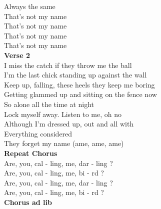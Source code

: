 Always the same \\
That's not my name \\
That's not my name \\
That's not my name \\
That's not my name \\
\textbf{Verse 2}\\
I miss the catch if they throw me the ball \\
I'm the last chick standing up against the wall \\
Keep up, falling, these heels they keep me boring \\
Getting glammed up and sitting on the fence now \\
So alone all the time at night \\
Lock myself away. Listen to me, oh no \\
Although I'm dressed up, out and all with \\
Everything considered\\
They forget my name (ame, ame, ame) \\
\textbf{Repeat Chorus}\\
Are, you, cal - ling, me, dar - ling ? \\
Are, you, cal - ling, me, bi - rd ? \\
Are, you, cal - ling, me, dar - ling ? \\
Are, you, cal - ling, me, bi - rd ? \\
\textbf{Chorus ad lib}


